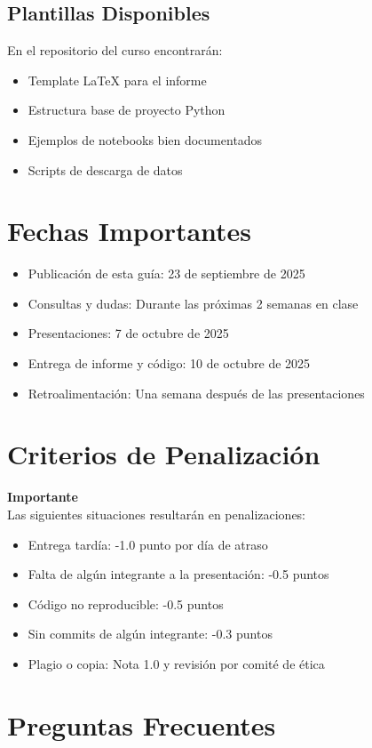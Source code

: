 \documentclass[11pt,a4paper]{article}
\begin{document}
\subsection{Plantillas Disponibles}
En el repositorio del curso encontrarán:
\begin{itemize}[leftmargin=1.2cm]
  \item Template LaTeX para el informe
  \item Estructura base de proyecto Python
  \item Ejemplos de notebooks bien documentados
  \item Scripts de descarga de datos
\end{itemize}

\section{Fechas Importantes}
\begin{itemize}[leftmargin=1.2cm]
  \item Publicación de esta guía: 23 de septiembre de 2025
  \item Consultas y dudas: Durante las próximas 2 semanas en clase
  \item Presentaciones: 7 de octubre de 2025
  \item Entrega de informe y código: 10 de octubre de 2025
  \item Retroalimentación: Una semana después de las presentaciones
\end{itemize}

\section{Criterios de Penalización}
\textbf{Importante}\\
Las siguientes situaciones resultarán en penalizaciones:
\begin{itemize}[leftmargin=1.2cm]
  \item Entrega tardía: -1.0 punto por día de atraso
  \item Falta de algún integrante a la presentación: -0.5 puntos
  \item Código no reproducible: -0.5 puntos
  \item Sin commits de algún integrante: -0.3 puntos
  \item Plagio o copia: Nota 1.0 y revisión por comité de ética
\end{itemize}

\section{Preguntas Frecuentes}
\end{document}
